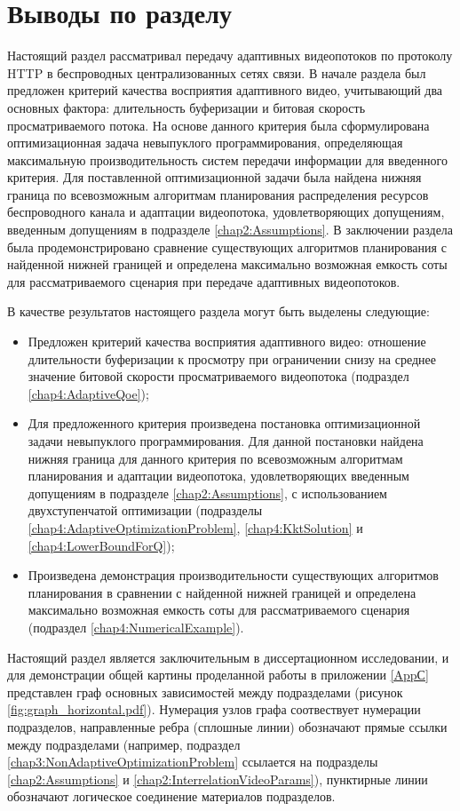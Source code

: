 \section{Выводы по разделу}

Настоящий раздел рассматривал передачу адаптивных видеопотоков по протоколу HTTP в беспроводных централизованных сетях связи. В начале раздела был предложен критерий качества восприятия адаптивного видео, учитывающий два основных фактора: длительность буферизации и битовая скорость просматриваемого потока. На основе данного критерия была сформулирована оптимизационная задача невыпуклого программирования, определяющая максимальную производительность систем передачи информации для введенного критерия. Для поставленной оптимизационной задачи была найдена нижняя граница по всевозможным алгоритмам планирования распределения ресурсов беспроводного канала и адаптации видеопотока, удовлетворяющих допущениям, введенным допущениям в подразделе \ref{chap2:Assumptions}. В заключении раздела была продемонстрировано сравнение существующих алгоритмов планирования с найденной нижней границей и определена максимально возможная емкость соты для рассматриваемого сценария при передаче адаптивных видеопотоков.

В качестве результатов настоящего раздела могут быть выделены следующие:
\begin{itemize}
	\item Предложен критерий качества восприятия адаптивного видео: отношение длительности буферизации к просмотру при ограничении снизу на среднее значение битовой скорости просматриваемого видеопотока (подраздел \ref{chap4:AdaptiveQoe});
	\item Для предложенного критерия произведена постановка оптимизационной задачи невыпуклого программирования. Для данной постановки найдена нижняя граница для данного критерия по всевозможным алгоритмам планирования и адаптации видеопотока, удовлетворяющих введенным допущениям в подразделе \ref{chap2:Assumptions}, с использованием двухступенчатой оптимизации (подразделы \ref{chap4:AdaptiveOptimizationProblem}, \ref{chap4:KktSolution} и \ref{chap4:LowerBoundForQ});
	\item Произведена демонстрация производительности существующих алгоритмов планирования в сравнении с найденной нижней границей и определена максимально возможная емкость соты для рассматриваемого сценария (подраздел \ref{chap4:NumericalExample}).
\end{itemize}

Настоящий раздел является заключительным в диссертационном исследовании, и для демонстрации общей картины проделанной работы в приложении \ref{AppС} представлен граф основных зависимостей между подразделами (рисунок \ref{fig:graph_horizontal.pdf}). Нумерация узлов графа соотвествует нумерации подразделов, направленные ребра (сплошные линии) обозначают прямые ссылки между подразделами (например, подраздел \ref{chap3:NonAdaptiveOptimizationProblem} ссылается на подразделы \ref{chap2:Assumptions} и \ref{chap2:InterrelationVideoParams}), пунктирные линии обозначают логическое соединение материалов подразделов. 

